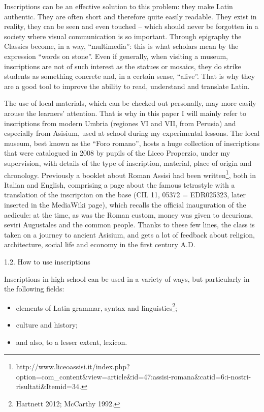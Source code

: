 \documentclass[amsthm,ebook]{saparticle}
\begin{document}
Inscriptions can be an effective solution to this problem: they make Latin authentic. They are often short and therefore
quite easily readable. They exist in reality, they can be seen and even touched – which should never be forgotten in a
society where visual communication is so important. Through epigraphy the Classics become, in a way, “multimedia”: this
is what scholars mean by the expression “words on stone”. Even if generally, when visiting a museum, inscriptions are
not of such interest as the statues or mosaics, they do strike students as something concrete and, in a certain sense,
“alive”. That is why they are a good tool to improve the ability to read, understand and translate Latin.

The use of local materials, which can be checked out personally, may more easily arouse the learners’ attention. That is
why in this paper I will mainly refer to inscriptions from modern Umbria (regiones VI and VII, from Perusia) and
especially from Asisium, used at school during my experimental lessons. The local museum, best known as the “Foro
romano”, hosts a huge collection of inscriptions that were catalogued in 2008 by pupils of the Liceo Properzio, under
my supervision, with details of the type of inscription, material, place of origin and chronology. Previously a booklet
about Roman Assisi had been
written\footnote{http://www.liceoassisi.it/index.php?option=com\_content\&view=article\&id=47:assisi-romana\&catid=6:i-nostri-risultati\&Itemid=34.},
both in Italian and English, comprising a page about the famous tetrastyle with a translation of the inscription on the
base (CIL 11, 05372 = EDR025323, later inserted in the MediaWiki page), which recalls the official inauguration of the
aedicule: at the time, as was the Roman custom, money was given to decurions, seviri Augustales and the common people.
Thanks to these few lines, the class is taken on a journey to ancient Asisium, and gets a lot of feedback about
religion, architecture, social life and economy in the first century A.D.

1.2. How to use inscriptions

Inscriptions in high school can be used in a variety of ways, but particularly in the following fields:

\begin{itemize}
\item elements of Latin grammar, syntax and linguistics\footnote{ Hartnett 2012; McCarthy 1992.};
\item culture and history;
\item and also, to a lesser extent, lexicon. 
\end{itemize}
\end{document}
